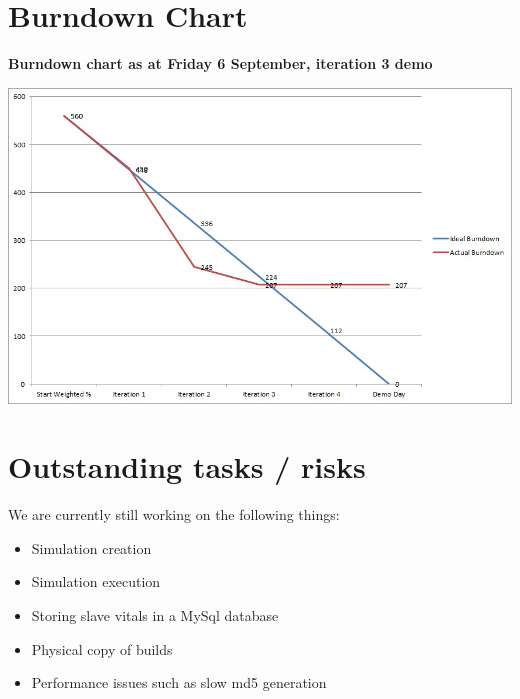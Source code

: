 \documentclass[a4paper,12pt,final]{article}
\begin{document}
\newpage
\section{Burndown Chart}
\begin{center}
\textbf{Burndown chart as at Friday 6 September, iteration 3 demo\\}
\end{center}
\begin{center}
\includegraphics[scale=0.7]{Burndown.jpg}
\end{center}




\section{Outstanding tasks / risks}
We are currently still working on the following things:
\begin{itemize}
\item Simulation creation
\item Simulation execution
\item Storing slave vitals in a MySql database
\item Physical copy of builds
\item Performance issues such as slow md5 generation
\end{itemize}
\end{document}
